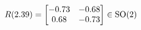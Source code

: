 \documentclass[preview]{standalone}
\begin{document}
\begin{align*}
\special{dvisvgm:raw <g id='unique000'>}R(2.39) = \begin{bmatrix} -0.73 & -0.68 \\ 0.68 & -0.73 \end{bmatrix} \in \text{SO}(2)\special{dvisvgm:raw </g>}
\end{align*}
\end{document}
